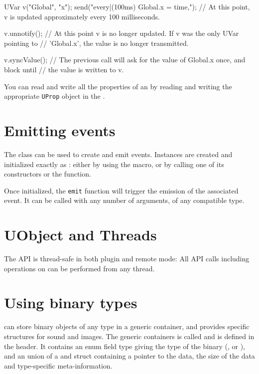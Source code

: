 \begin{cxx}
UVar v("Global", "x");
send("every|(100ms) Global.x = time,");
// At this point, v is updated approximately every 100 milliseconds.

v.unnotify();
// At this point v is no longer updated. If v was the only UVar pointing to
// 'Global.x', the value is no longer transmitted.

v.syncValue();
// The previous call will ask for the value of Global.x once, and block until
// the value is written to v.
\end{cxx}

You can read and write all the \urbi properties of an \UVar by
reading and writing the appropriate \lstinline{UProp} object in the
\UVar.

\section{Emitting events}

The \UEvent class can be used to create and emit \us events. Instances are
created and initialized exactly as \UVar: either by using the
 macro, or by calling one of its constructors or the
 function.

Once initialized, the \lstinline{emit} function will trigger the emission of
the associated \us event. It can be called with any number of arguments, of
any compatible type.

\section{UObject and Threads}

The \UObject API is thread-safe in both plugin and remote mode: All API
calls including operations on \UVar can be performed from any thread.

\section{Using binary types}

\urbi can store binary objects of any type in a generic container, and
provides specific structures for sound and images. The generic containers is
called \UBinary and is defined in the  header.  It
contains an enum field type giving the type of the binary
(,  or ), and an union of
a \USound and \UImage struct containing a pointer to the data, the size of
the data and type-specific meta-information.

